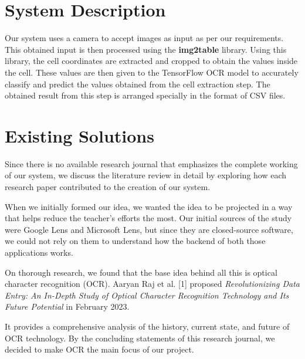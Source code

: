 \section{System Description}

Our system uses a camera to accept images as input as per our requirements. This obtained input is then processed using the \textbf{img2table} library. Using this library, the cell coordinates are extracted and cropped to obtain the values inside the cell. These values are then given to the TensorFlow OCR model to accurately classify and predict the values obtained from the cell extraction step. The obtained result from this step is arranged specially in the format of CSV files.

\section{Existing Solutions}

\noindent
Since there is no available research journal that emphasizes the complete working of our system, we discuss the literature review in detail by exploring how each research paper contributed to the creation of our system.

\noindent
When we initially formed our idea, we wanted the idea to be projected in a way that helps reduce the teacher's efforts the most. Our initial sources of the study were Google Lens and Microsoft Lens, but since they are closed-source software, we could not rely on them to understand how the backend of both those applications works. 

\clearpage

\noindent
On thorough research, we found that the base idea behind all this is optical character recognition (OCR). Aaryan Raj et al. [1] proposed {\it Revolutionizing Data Entry: An In-Depth Study of Optical Character Recognition Technology and Its Future Potential} in February 2023. 

\noindent
It provides a comprehensive analysis of the history, current state, and future of OCR technology. By the concluding statements of this research journal, we decided to make OCR the main focus of our project.

